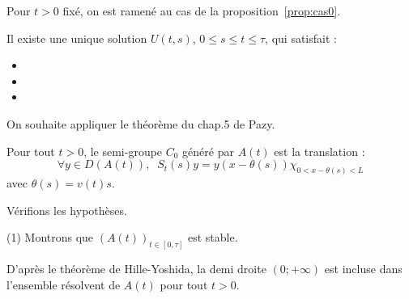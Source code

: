 \documentclass[a4paper]{article}
\begin{document}
\begin{preuve}
	Pour $t>0$ fixé, on est ramené au cas de la proposition~\ref{prop:cas0}.
\end{preuve}

\begin{proposition}
	Il existe une unique solution $U(t,s)$, $0\leq s \leq t \leq \tau $, qui satisfait :
	\begin{itemize}
		\item 
		\item 
		\item 
	\end{itemize}
\end{proposition}

\begin{preuve}
	On souhaite appliquer le théorème du chap.5 de Pazy.
	
	\begin{lemme}
		Pour tout $t>0$, le semi-groupe $C_0$ généré par $A(t)$ est la translation :
		\[ \forall y \in D(A(t)), \; \; S_t(s)y = y(x - \theta(s)) \chi_{0<x - \theta(s)<L} \]
		avec $\theta (s) = v(t)s$.
		
	\end{lemme}
	
	Vérifions les hypothèses.
	
	\vspace{0.3cm}
	(1)
	Montrons que $(A(t))_{t \in [0,\tau]}$ est stable.
	
	D'après le théorème de Hille-Yoshida, la demi droite $(0; +\infty)$ est incluse dans l'ensemble résolvent de $A(t)$ pour tout $t>0$.
	
\end{preuve}
\end{document}
